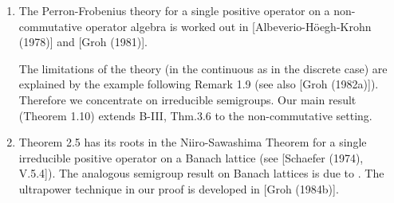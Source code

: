 \begin{enumerate}[label=\emph{Section \arabic*:}, wide]

\item
The Perron-Frobenius theory for a single positive operator on a non-commutative operator algebra is worked out in [Albeverio-Höegh-Krohn (1978)] and [Groh (1981)].



\newpage


The limitations of the theory (in the continuous as in the discrete case)
are explained by the example following Remark 1.9 (see also [Groh (1982a)]).
Therefore we concentrate on irreducible semigroups.
Our main result (Theorem 1.10) extends B-III, Thm.3.6 to the non-commutative setting.

\item
Theorem 2.5 has its roots in the Niiro-Sawashima Theorem for a single irreducible positive operator on a Banach lattice (see [Schaefer (1974), V.5.4]).
The analogous semigroup result on Banach lattices is due to \citet{greiner:1982}.
The ultrapower technique in our proof is developed in [Groh (1984b)].

\end{enumerate}




































